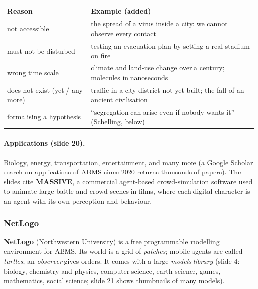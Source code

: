 \begin{center}
\small
\begin{tabularx}{\linewidth}{@{}l X@{}}
\toprule
\textbf{Reason} & \textbf{Example (added)} \\
\midrule
not accessible & the spread of a virus inside a city: we cannot observe every contact \\
must not be disturbed & testing an evacuation plan by setting a real stadium on fire \\
wrong time scale & climate and land-use change over a century; molecules in nanoseconds \\
does not exist (yet / any more) & traffic in a city district not yet built; the fall of an ancient civilisation \\
formalising a hypothesis & ``segregation can arise even if nobody wants it'' (Schelling, below) \\
\bottomrule
\end{tabularx}
\end{center}

\paragraph{Applications (slide 20).} Biology, energy, transportation, entertainment, and
many more (a Google Scholar search on applications of ABMS since 2020 returns thousands of
papers). The slides cite \textbf{MASSIVE}, a commercial agent-based crowd-simulation software
used to animate large battle and crowd scenes in films, where each digital character is an
agent with its own perception and behaviour.

\subsubsection{NetLogo}

\textbf{NetLogo} (Northwestern University) is a free programmable modelling environment for
ABMS. Its world is a grid of \emph{patches}; mobile agents are called \emph{turtles}; an
\emph{observer} gives orders. It comes with a large \emph{models library} (slide 4: biology,
chemistry and physics, computer science, earth science, games, mathematics, social science;
slide 21 shows thumbnails of many models).

